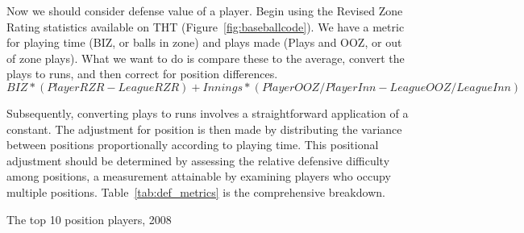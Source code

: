 \documentclass[12pt]{article}
\begin{document}
Now we should consider defense value of a player. Begin using the Revised Zone Rating statistics \citep*{web:Studeman2007Field} 
available on THT (Figure~\ref*{fig:baseballcode}). We have a metric for playing time 
(BIZ, or balls in zone) and plays made (Plays and OOZ, or out of zone plays). What we want to 
do is compare these to the average, convert the plays to runs, and then correct for position differences.
\begin{equation}
  \label{eq:RZR}
  BIZ * (PlayerRZR - LeagueRZR) + Innings * (PlayerOOZ/PlayerInn - LeagueOOZ/LeagueInn)
\end{equation}

Subsequently, converting plays to runs involves a straightforward application of a constant. The adjustment
for position is then made by distributing the variance between positions proportionally according to playing 
time. This positional adjustment should be determined by assessing the relative defensive difficulty among 
positions, a measurement attainable by examining players who occupy multiple positions. Table~\ref*{tab:def_metrics}
is the comprehensive breakdown.

\begin{table}[htp]
  \caption{Full Nitty-Gritty}
  \label{tab:def_metrics} 
  \centering
\cite*{web:Wyers:Part3}
\end{table}

The top 10 position players, 2008
\end{document}
